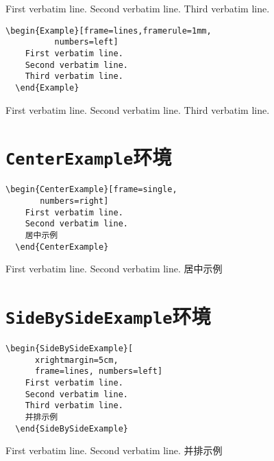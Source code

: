 \documentclass[twoside]{article}
\begin{document}
\begin{changebar}
\begin{Example}
  First verbatim line.
  Second verbatim line.
  Third verbatim line.
\end{Example}

\begin{Verbatim}[gobble=2]
  \begin{Example}[frame=lines,framerule=1mm,
          numbers=left]
    First verbatim line.
    Second verbatim line.
    Third verbatim line.
  \end{Example}
\end{Verbatim}

\begin{Example}[frame=lines,framerule=1mm,numbers=left]
  First verbatim line.
  Second verbatim line.
  Third verbatim line.
\end{Example}

\newpage

\section{\texttt{CenterExample}环境}

\begin{Verbatim}[gobble=2]
  \begin{CenterExample}[frame=single,
       numbers=right]
    First verbatim line.
    Second verbatim line.
    居中示例
  \end{CenterExample}
\end{Verbatim}

\begin{CenterExample}[frame=single,numbers=right]
  First verbatim line.
  Second verbatim line.
  居中示例
\end{CenterExample}


\section{\texttt{SideBySideExample}环境}

\begin{Verbatim}[gobble=2]
  \begin{SideBySideExample}[
      xrightmargin=5cm,
      frame=lines, numbers=left]
    First verbatim line.
    Second verbatim line.
    Third verbatim line.
    并排示例
  \end{SideBySideExample}
\end{Verbatim}

\begin{SideBySideExample}[xrightmargin=5cm,frame=single,numbers=left]
  First verbatim line.
  Second verbatim line.
  并排示例
\end{SideBySideExample}




\end{changebar}
\end{document}
